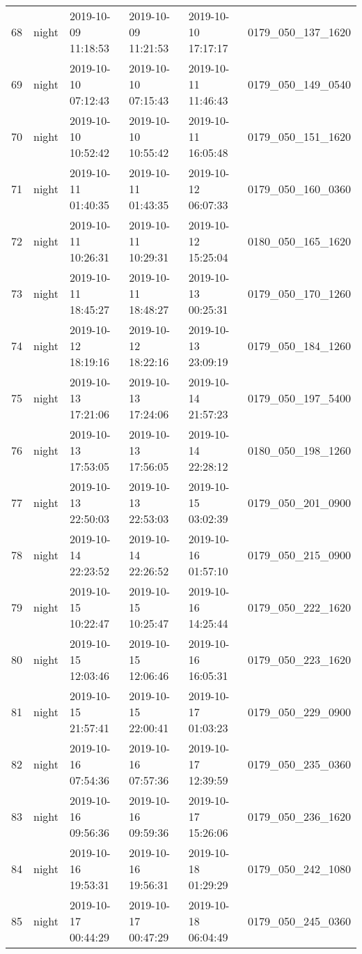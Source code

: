 \begin{longtable}{rlllll}
      68 &    night & 2019-10-09 11:18:53 & 2019-10-09 11:21:53 & 2019-10-10 17:17:17 & 0179\_050\_137\_1620 \\
      69 &    night & 2019-10-10 07:12:43 & 2019-10-10 07:15:43 & 2019-10-11 11:46:43 & 0179\_050\_149\_0540 \\
      70 &    night & 2019-10-10 10:52:42 & 2019-10-10 10:55:42 & 2019-10-11 16:05:48 & 0179\_050\_151\_1620 \\
      71 &    night & 2019-10-11 01:40:35 & 2019-10-11 01:43:35 & 2019-10-12 06:07:33 & 0179\_050\_160\_0360 \\
      72 &    night & 2019-10-11 10:26:31 & 2019-10-11 10:29:31 & 2019-10-12 15:25:04 & 0180\_050\_165\_1620 \\
      73 &    night & 2019-10-11 18:45:27 & 2019-10-11 18:48:27 & 2019-10-13 00:25:31 & 0179\_050\_170\_1260 \\
      74 &    night & 2019-10-12 18:19:16 & 2019-10-12 18:22:16 & 2019-10-13 23:09:19 & 0179\_050\_184\_1260 \\
      75 &    night & 2019-10-13 17:21:06 & 2019-10-13 17:24:06 & 2019-10-14 21:57:23 & 0179\_050\_197\_5400 \\
      76 &    night & 2019-10-13 17:53:05 & 2019-10-13 17:56:05 & 2019-10-14 22:28:12 & 0180\_050\_198\_1260 \\
      77 &    night & 2019-10-13 22:50:03 & 2019-10-13 22:53:03 & 2019-10-15 03:02:39 & 0179\_050\_201\_0900 \\
      78 &    night & 2019-10-14 22:23:52 & 2019-10-14 22:26:52 & 2019-10-16 01:57:10 & 0179\_050\_215\_0900 \\
      79 &    night & 2019-10-15 10:22:47 & 2019-10-15 10:25:47 & 2019-10-16 14:25:44 & 0179\_050\_222\_1620 \\
      80 &    night & 2019-10-15 12:03:46 & 2019-10-15 12:06:46 & 2019-10-16 16:05:31 & 0179\_050\_223\_1620 \\
      81 &    night & 2019-10-15 21:57:41 & 2019-10-15 22:00:41 & 2019-10-17 01:03:23 & 0179\_050\_229\_0900 \\
      82 &    night & 2019-10-16 07:54:36 & 2019-10-16 07:57:36 & 2019-10-17 12:39:59 & 0179\_050\_235\_0360 \\
      83 &    night & 2019-10-16 09:56:36 & 2019-10-16 09:59:36 & 2019-10-17 15:26:06 & 0179\_050\_236\_1620 \\
      84 &    night & 2019-10-16 19:53:31 & 2019-10-16 19:56:31 & 2019-10-18 01:29:29 & 0179\_050\_242\_1080 \\
      85 &    night & 2019-10-17 00:44:29 & 2019-10-17 00:47:29 & 2019-10-18 06:04:49 & 0179\_050\_245\_0360 \\

\end{longtable}

